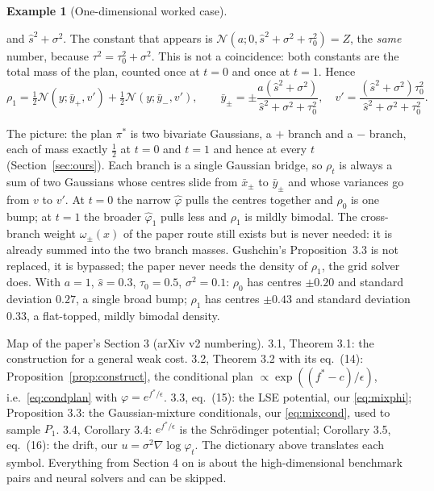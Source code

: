 \documentclass[11pt]{article}
\newcommand{\Nc}{\mathcal{N}}
\newcommand{\hphi}{\hat\varphi}
\theoremstyle{definition}
\newtheorem{example}[definition]{Example}
\theoremstyle{plain}
\begin{document}
\begin{example}[One-dimensional worked case]
\begin{enumerate}
        and $\hat s^2+\sigma^2$. The constant that appears is
        $\Nc(a;0,\hat s^2+\sigma^2+\tau_0^2)=Z$, the \emph{same} number, because
        $\tau^2=\tau_0^2+\sigma^2$. This is not a coincidence: both constants are the total
        mass of the plan, counted once at $t=0$ and once at $t=1$. Hence
        \[
          \rho_1=\tfrac12\Nc(y;\bar y_+,v')+\tfrac12\Nc(y;\bar y_-,v'),\qquad
          \bar y_\pm=\pm\frac{a(\hat s^2+\sigma^2)}{\hat s^2+\sigma^2+\tau_0^2},\quad
          v'=\frac{(\hat s^2+\sigma^2)\tau_0^2}{\hat s^2+\sigma^2+\tau_0^2}.
        \]
\end{enumerate}
The picture: the plan $\pi^*$ is two bivariate Gaussians, a $+$ branch and a $-$ branch, each
of mass exactly $\tfrac12$ at $t=0$ and $t=1$ and hence at every $t$ (Section~\ref{sec:ours}).
Each branch is a single Gaussian bridge, so $\rho_t$ is always a sum of two Gaussians whose
centres slide from $\bar x_\pm$ to $\bar y_\pm$ and whose variances go from $v$ to $v'$. At
$t=0$ the narrow $\hphi$ pulls the centres together and $\rho_0$ is one bump; at $t=1$ the
broader $\hphi_1$ pulls less and $\rho_1$ is mildly bimodal. The cross-branch weight
$\omega_\pm(x)$ of the paper route still exists but is never needed: it is already summed
into the two branch masses. Gushchin's Proposition~3.3 is not replaced, it is bypassed; the
paper never needs the density of $\rho_1$, the grid solver does.
With $a=1$, $\hat s=0.3$, $\tau_0=0.5$, $\sigma^2=0.1$:
$\rho_0$ has centres $\pm0.20$ and standard deviation $0.27$, a single broad bump; $\rho_1$
has centres $\pm0.43$ and standard deviation $0.33$, a flat-topped, mildly bimodal density.
\end{example}

\begin{readbox}
Map of the paper's Section 3 (arXiv v2 numbering). 3.1, Theorem 3.1: the construction for a
general weak cost. 3.2, Theorem 3.2 with its eq.\ (14): Proposition~\ref{prop:construct}, the
conditional plan $\propto\exp((f^*-c)/\epsilon)$, i.e.\ \eqref{eq:condplan} with
$\varphi=e^{f^*/\epsilon}$. 3.3, eq.\ (15): the LSE potential, our \eqref{eq:mixphi};
Proposition 3.3: the Gaussian-mixture conditionals, our \eqref{eq:mixcond}, used to sample
$P_1$. 3.4, Corollary 3.4: $e^{f^*/\epsilon}$ is the Schr\"odinger potential; Corollary 3.5,
eq.\ (16): the drift, our $u=\sigma^2\nabla\log\varphi_t$. The dictionary above translates each
symbol. Everything from Section 4 on is about the high-dimensional benchmark pairs and neural
solvers and can be skipped.
\end{readbox}
\end{document}
